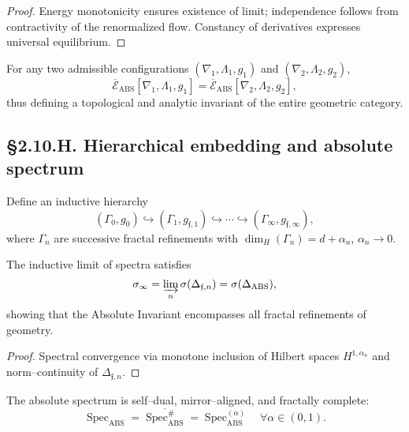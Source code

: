 \begin{proof}
Energy monotonicity ensures existence of limit; independence follows from contractivity of the renormalized flow.
Constancy of derivatives expresses universal equilibrium.
\end{proof}

\begin{corollary}
For any two admissible configurations $(\nabla_1,\Lambda_1,g_1)$ and $(\nabla_2,\Lambda_2,g_2)$,
\[
\overline{\mathcal{E}}_{\mathrm{ABS}}[\nabla_1,\Lambda_1,g_1]
=\overline{\mathcal{E}}_{\mathrm{ABS}}[\nabla_2,\Lambda_2,g_2],
\]
thus defining a topological and analytic invariant of the entire geometric category.
\end{corollary}

\subsection*{§2.10.H. Hierarchical embedding and absolute spectrum}

\begin{definition}
Define an inductive hierarchy
\[
(\Gamma_0,g_0)\hookrightarrow(\Gamma_1,g_{\mathfrak{f},1})\hookrightarrow\cdots\hookrightarrow
(\Gamma_\infty,g_{\mathfrak{f},\infty}),
\]
where $\Gamma_n$ are successive fractal refinements with $\dim_H(\Gamma_n)=d+\alpha_n$,
$\alpha_n\to0$.
\]
\end{definition}

\begin{theorem}\label{thm:2.10.limit}
The inductive limit of spectra satisfies
\[
\sigma_{\infty}=\varinjlim_n \sigma(\Delta_{\mathfrak{f},n})
=\sigma(\Delta_{\mathrm{ABS}}),
\]
showing that the Absolute Invariant encompasses all fractal refinements of geometry.
\end{theorem}

\begin{proof}
Spectral convergence via monotone inclusion of Hilbert spaces $H^{1,\alpha_n}$ and norm–continuity of $\Delta_{\mathfrak{f},n}$.
\end{proof}

\begin{corollary}
The absolute spectrum is self–dual, mirror–aligned, and fractally complete:
\[
\operatorname{Spec}_{\mathrm{ABS}}=
\overline{\operatorname{Spec}_{\mathrm{ABS}}^\#}=
\operatorname{Spec}_{\mathrm{ABS}}^{(\alpha)}\quad
\forall \alpha\in(0,1).
\]
\]
\end{corollary}

